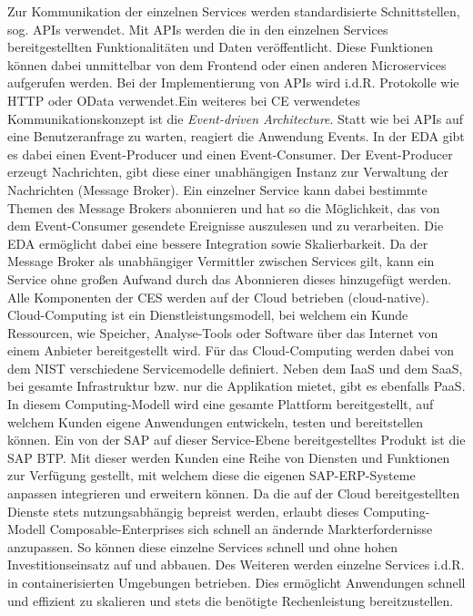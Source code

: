 Zur Kommunikation der einzelnen Services werden standardisierte Schnittstellen, sog. \ac*{APIs} verwendet. Mit APIs werden die in den einzelnen Services bereitgestellten Funktionalitäten und Daten veröffentlicht. Diese Funktionen können dabei unmittelbar von dem Frontend oder einen anderen Microservices aufgerufen werden. Bei der Implementierung von APIs wird i.d.R. Protokolle wie HTTP oder OData verwendet.Ein weiteres bei CE verwendetes Kommunikationskonzept ist die \textit{Event-driven Architecture}. Statt wie bei APIs auf eine Benutzeranfrage zu warten, reagiert die Anwendung Events. In der EDA gibt es dabei einen Event-Producer und einen Event-Consumer. Der Event-Producer erzeugt Nachrichten, gibt diese einer unabhängigen Instanz zur Verwaltung der Nachrichten (Message Broker). Ein einzelner Service kann dabei bestimmte Themen des Message Brokers abonnieren und hat so die Möglichkeit, das von dem Event-Consumer gesendete Ereignisse auszulesen und zu verarbeiten. Die EDA ermöglicht dabei eine bessere Integration sowie Skalierbarkeit. Da der Message Broker als unabhängiger Vermittler zwischen Services gilt, kann ein Service ohne großen Aufwand durch das Abonnieren dieses hinzugefügt werden. Alle Komponenten der CES werden auf der Cloud betrieben (cloud-native). Cloud-Computing ist ein Dienstleistungsmodell, bei welchem ein Kunde Ressourcen, wie Speicher, Analyse-Tools oder Software über das Internet von einem Anbieter bereitgestellt wird. Für das Cloud-Computing werden dabei von dem \ac{NIST} verschiedene Servicemodelle definiert. Neben dem \ac{IaaS} und dem \ac{SaaS}, bei gesamte Infrastruktur bzw. nur die Applikation mietet, gibt es ebenfalls \ac*{PaaS}. In diesem Computing-Modell wird eine gesamte Plattform bereitgestellt, auf welchem Kunden eigene Anwendungen entwickeln, testen und bereitstellen können. Ein von der SAP auf dieser Service-Ebene bereitgestelltes Produkt ist die SAP \ac{BTP}. Mit dieser werden Kunden eine Reihe von Diensten und Funktionen zur Verfügung gestellt, mit welchem diese die eigenen SAP-ERP-Systeme anpassen integrieren und erweitern können. Da die auf der Cloud bereitgestellten Dienste stets nutzungsabhängig bepreist werden, erlaubt dieses Computing-Modell Composable-Enterprises sich schnell an ändernde Markterfordernisse anzupassen. So können diese einzelne Services schnell und ohne hohen Investitionseinsatz auf und abbauen. Des Weiteren werden einzelne Services i.d.R. in containerisierten Umgebungen betrieben. Dies ermöglicht Anwendungen schnell und effizient zu skalieren und stets die benötigte Rechenleistung bereitzustellen. 
\newpage
